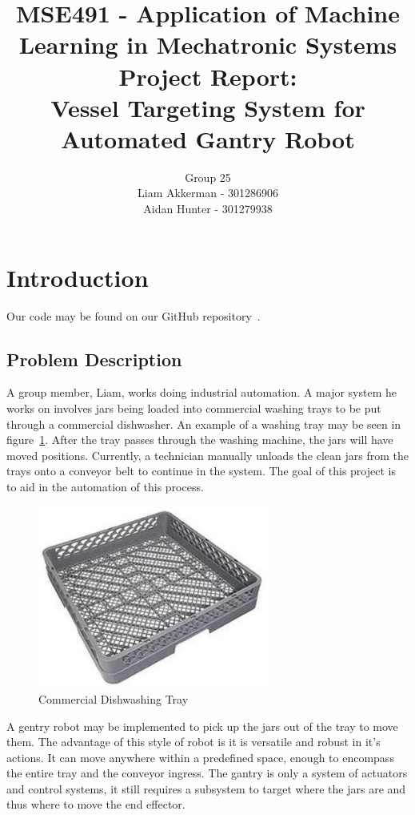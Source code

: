 \documentclass[11pt]{article}
\title{{\large MSE491 - Application of Machine Learning in Mechatronic Systems} \\ Project Report: \\ Vessel Targeting System for Automated Gantry Robot}
\author{Group 25 \\ Liam Akkerman - 301286906 \\ Aidan Hunter - 301279938}
\begin{document}
    \maketitle
    \vfill
	\setcounter{tocdepth}{2} %
    \tableofcontents %
    \FloatBarrier 
    \newpage

    \FloatBarrier
    \section{Introduction}
        Our code may be found on our GitHub repository~\cite{akkerman_hunter}. %
        \subsection{Problem Description}
            A group member, Liam, works doing industrial automation. A major system he works on involves jars being loaded into commercial washing trays to be put through a commercial dishwasher. An example of a washing tray may be seen in figure~\ref{fig:tray}. After the tray passes through the washing machine, the jars will have moved positions. Currently, a technician manually unloads the clean jars from the trays onto a conveyor belt to continue in the system. The goal of this project is to aid in the automation of this process.

            \begin{figure}[ht]
                \centering
                \includegraphics[height=6cm]{images/tray.jpg}
                \caption{Commercial Dishwashing Tray}\label{fig:tray}
            \end{figure}

            A gentry robot may be implemented to pick up the jars out of the tray to move them. The advantage of this style of robot is it is versatile and robust in it's actions. It can move anywhere within a predefined space, enough to encompass the entire tray and the conveyor ingress. The gantry is only a system of actuators and control systems, it still requires a subsystem to target where the jars are and thus where to move the end effector. 
            
\end{document}
